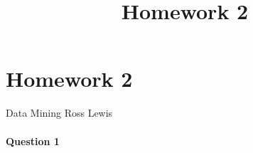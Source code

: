 \documentclass[11pt]{article}
\title{Homework 2}
\begin{document}
    
    
    \maketitle
    
    

    
    \hypertarget{homework-2}{%
\section{Homework 2}\label{homework-2}}

Data Mining Ross Lewis

\hypertarget{question-1}{%
\paragraph{Question 1}\label{question-1}}
\end{document}
